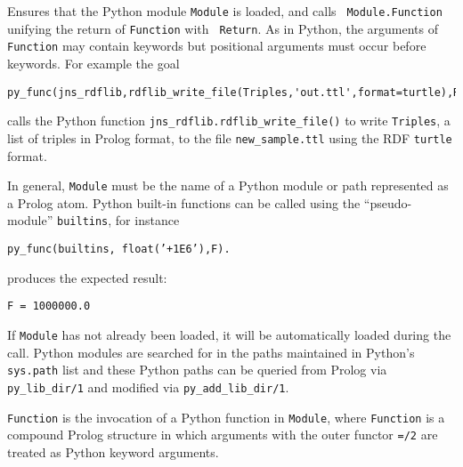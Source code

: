 \begin{description}

%
 Ensures that the Python module {\tt Module} is loaded, and calls {\tt
   Module.Function} unifying the return of {\tt Function} with {\tt
   Return}.  As in Python, the arguments of {\tt Function} may contain
 keywords but positional arguments must occur before keywords.  For
 example the goal

\begin{verbatim}
py_func(jns_rdflib,rdflib_write_file(Triples,'out.ttl',format=turtle),Ret).
\end{verbatim}

calls the Python function {\tt jns\_rdflib.rdflib\_write\_file()} to
write {\tt Triples}, a list of triples in Prolog format, to the file
{\tt new\_sample.ttl} using the RDF {\tt turtle} format.

In general, {\tt Module} must be the name of a Python module or path
represented as a Prolog atom.  Python built-in functions can be called
using the ``pseudo-module'' {\tt builtins}, for instance

{\tt  py\_func(builtins, float('+1E6'),F).}

\noindent
produces the expected result:

{\tt F = 1000000.0}

\noindent
If {\tt Module} has not already been
  loaded, it will be automatically loaded during the call.  Python modules are
  searched for in the paths maintained in Python's {\tt sys.path} list
  and these Python paths can be queried from Prolog via {\tt
    py\_lib\_dir/1} and modified via {\tt py\_add\_lib\_dir/1}.
     
{\tt Function} is the invocation of a Python function in {\tt Module},
where {\tt Function} is a compound Prolog structure in which arguments
with the outer functor {\tt =/2} are treated as Python keyword
arguments.


\end{description}
